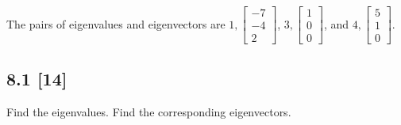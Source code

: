 \documentclass{article}
\begin{document}
The pairs of eigenvalues and eigenvectors are $1, \begin{bmatrix} -7\\-4\\2 \end{bmatrix}$, $3, \begin{bmatrix} 1\\0\\0 \end{bmatrix}$, and $4, \begin{bmatrix} 5\\1\\0\end{bmatrix}$.

\subsection*{8.1 [14]}
\setcounter{equation}{0}

Find the eigenvalues.  Find the corresponding eigenvectors.
\end{document}

